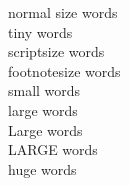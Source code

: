 \documentclass[a4paper,12pt]{article}
\begin{document}
\noindent
normal size words \\
{\tiny tiny words} \\
{\scriptsize scriptsize words} \\
{\footnotesize footnotesize words} \\
{\small small words} \\
{\large large words} \\
{\Large Large words} \\
{\LARGE LARGE words} \\
{\huge huge words}
\end{document}
